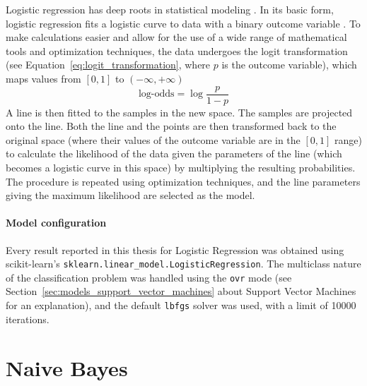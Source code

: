 \documentclass[../main.tex]{subfiles}
\begin{document}
Logistic regression has deep roots in statistical modeling \cite{logistic_regression_cramer2002origins}.
In its basic form, logistic regression fits a logistic curve to data with a binary outcome variable
\cite{hosmer2013applied_logistic_regression}. To make calculations easier and allow for the use of a
wide range of mathematical tools and optimization techniques, the data undergoes the logit transformation (see Equation~\ref{eq:logit_transformation}, where $p$ is the outcome variable),
which maps values from $[0,1]$ to $(-\infty, +\infty)$
\begin{equation}
    \text{log-odds} = \log{\frac{p}{1-p}}
    \label{eq:logit_transformation}
\end{equation}
A line is then fitted to the samples in the new space. The samples are projected onto the line. Both the line and the points are then transformed back to the original space (where their values of the outcome variable are in the $[0, 1]$ range) to calculate the likelihood of the data given the parameters of the line (which becomes a logistic curve in this space) by multiplying the resulting probabilities. The procedure is repeated using optimization techniques, and the line parameters giving the maximum likelihood are selected as the model.

\paragraph{Model configuration}

Every result reported in this thesis for Logistic Regression was obtained using scikit-learn's \cite{scikit-learn} \verb|sklearn.linear_model.LogisticRegression|. The multiclass nature of the classification problem was handled using the \verb|ovr| mode (see Section~\ref{sec:models_support_vector_machines} about Support Vector Machines for an explanation), and the default \verb|lbfgs| solver was used, with a limit of 10000 iterations.


\section{Naive Bayes}
\label{sec:models_naive_bayes}
\end{document}
